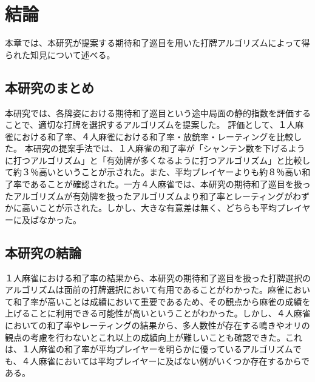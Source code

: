 \chapter{結論}
\label{chap:conclusion}

本章では、本研究が提案する期待和了巡目を用いた打牌アルゴリズムによって得られた知見について述べる。

\section{本研究のまとめ}
本研究では、各牌姿における期待和了巡目という途中局面の静的指数を評価することで、適切な打牌を選択するアルゴリズムを提案した。
評価として、１人麻雀における和了率、４人麻雀における和了率・放銃率・レーティングを比較した。
本研究の提案手法では、１人麻雀の和了率が「シャンテン数を下げるように打つアルゴリズム」と「有効牌が多くなるように打つアルゴリズム」と比較して約３％高いということが示された。また、平均プレイヤーよりも約８％高い和了率であることが確認された。一方４人麻雀では、本研究の期待和了巡目を扱ったアルゴリズムが有効牌を扱ったアルゴリズムより和了率とレーティングがわずかに高いことが示された。しかし、大きな有意差は無く、どちらも平均プレイヤーに及ばなかった。

\section{本研究の結論}
１人麻雀における和了率の結果から、本研究の期待和了巡目を扱った打牌選択のアルゴリズムは面前の打牌選択において有用であることがわかった。麻雀において和了率が高いことは成績において重要であるため、その観点から麻雀の成績を上げることに利用できる可能性が高いということがわかった。しかし、４人麻雀においての和了率やレーティングの結果から、多人数性が存在する鳴きやオリの観点の考慮を行わないとこれ以上の成績向上が難しいことも確認できた。これは、１人麻雀の和了率が平均プレイヤーを明らかに優っているアルゴリズムでも、４人麻雀においては平均プレイヤーに及ばない例がいくつか存在するからである。

